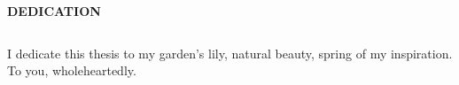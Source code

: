 \begin{center}
\textbf{DEDICATION}
\end{center}

$\!$\\

\null
\vfill
\begin{center}
\noindent I dedicate this thesis to my garden's lily, natural beauty, spring of my inspiration. To you, wholeheartedly. 
\end{center}



